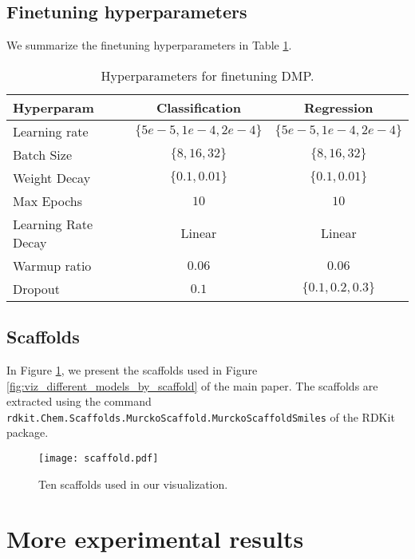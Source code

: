 \documentclass{article}
\newcommand{\ourM}{DMP}
\begin{document}
\subsection{Finetuning hyperparameters}\label{appendix:finetuninghyperparaments}
We summarize the finetuning hyperparameters in Table \ref{tab:finetuning_hyperparameter}.
\begin{table}[!h]
    \centering
    \begin{tabular}{lcc}
    \toprule
    \textbf{Hyperparam} & \textbf{Classification} & \textbf{Regression} \\
    \midrule
      Learning rate &$\{5e-5, 1e-4, 2e-4\}$  & $\{5e-5, 1e-4, 2e-4\}$ \\
      Batch Size & $\{ 8,16,32\}$& $\{ 8,16,32\}$ \\
      Weight Decay & $\{0.1,0.01\}$& $\{0.1,0.01\}$\\
      Max Epochs &$10$&$10$ \\
      Learning Rate Decay &Linear&Linear \\
      Warmup ratio& $0.06$&$0.06$ \\
      Dropout &$0.1$ & $\{0.1, 0.2, 0.3\}$\\
      \bottomrule
    \end{tabular}
    \caption{Hyperparameters for finetuning \ourM{}.}
    \label{tab:finetuning_hyperparameter}
\end{table}
\subsection{Scaffolds}\label{appendix:scaffold}
In Figure \ref{fig:scaffold}, we present the scaffolds used in Figure \ref{fig:viz_different_models_by_scaffold} of the main paper. The scaffolds are extracted using the command \texttt{rdkit.Chem.Scaffolds.MurckoScaffold.MurckoScaffoldSmiles} of the RDKit package.
\begin{figure}[!htb]
    \centering
    \texttt{[image: scaffold.pdf]}
    \caption{Ten scaffolds used in our visualization.}
    \label{fig:scaffold}
\end{figure}
\section{More experimental results}
\end{document}
